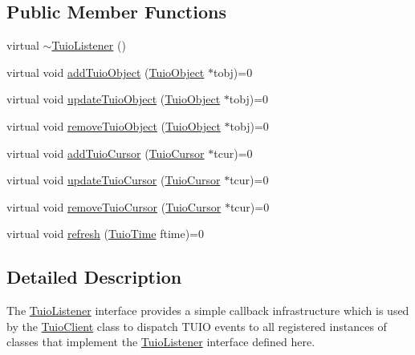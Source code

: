 \subsection*{Public Member Functions}
\begin{DoxyCompactItemize}
\item 
virtual \hyperlink{class_t_u_i_o_1_1_tuio_listener_ad26ffa48dd45e148e6582724da49b283}{$\sim$\+Tuio\+Listener} ()
\item 
virtual void \hyperlink{class_t_u_i_o_1_1_tuio_listener_a7180002e5898259cecdb8b614a0f67ff}{add\+Tuio\+Object} (\hyperlink{class_t_u_i_o_1_1_tuio_object}{Tuio\+Object} $\ast$tobj)=0
\item 
virtual void \hyperlink{class_t_u_i_o_1_1_tuio_listener_a27a13b031781a609c08bc40548d2e42d}{update\+Tuio\+Object} (\hyperlink{class_t_u_i_o_1_1_tuio_object}{Tuio\+Object} $\ast$tobj)=0
\item 
virtual void \hyperlink{class_t_u_i_o_1_1_tuio_listener_acf6d81485aaad7747cb399c325b831ee}{remove\+Tuio\+Object} (\hyperlink{class_t_u_i_o_1_1_tuio_object}{Tuio\+Object} $\ast$tobj)=0
\item 
virtual void \hyperlink{class_t_u_i_o_1_1_tuio_listener_a431a957994470c3767e94379debeb875}{add\+Tuio\+Cursor} (\hyperlink{class_t_u_i_o_1_1_tuio_cursor}{Tuio\+Cursor} $\ast$tcur)=0
\item 
virtual void \hyperlink{class_t_u_i_o_1_1_tuio_listener_a1d60e2d80b0e09d74ded8713362c43c4}{update\+Tuio\+Cursor} (\hyperlink{class_t_u_i_o_1_1_tuio_cursor}{Tuio\+Cursor} $\ast$tcur)=0
\item 
virtual void \hyperlink{class_t_u_i_o_1_1_tuio_listener_ade7712d189c28c82c447a815022254d9}{remove\+Tuio\+Cursor} (\hyperlink{class_t_u_i_o_1_1_tuio_cursor}{Tuio\+Cursor} $\ast$tcur)=0
\item 
virtual void \hyperlink{class_t_u_i_o_1_1_tuio_listener_a14d16f24c27bb22fe2e24419e447dd63}{refresh} (\hyperlink{class_t_u_i_o_1_1_tuio_time}{Tuio\+Time} ftime)=0
\end{DoxyCompactItemize}


\subsection{Detailed Description}
The \hyperlink{class_t_u_i_o_1_1_tuio_listener}{Tuio\+Listener} interface provides a simple callback infrastructure which is used by the \hyperlink{class_t_u_i_o_1_1_tuio_client}{Tuio\+Client} class to dispatch T\+U\+IO events to all registered instances of classes that implement the \hyperlink{class_t_u_i_o_1_1_tuio_listener}{Tuio\+Listener} interface defined here.

